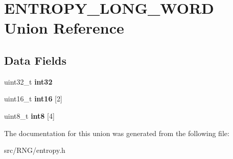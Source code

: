 \hypertarget{union_e_n_t_r_o_p_y___l_o_n_g___w_o_r_d}{\section{E\+N\+T\+R\+O\+P\+Y\+\_\+\+L\+O\+N\+G\+\_\+\+W\+O\+R\+D Union Reference}
\label{union_e_n_t_r_o_p_y___l_o_n_g___w_o_r_d}
}
\subsection*{Data Fields}
\begin{DoxyCompactItemize}
\item 
\hypertarget{union_e_n_t_r_o_p_y___l_o_n_g___w_o_r_d_adfb304a74bc0ee2042775783a2ed5ff5}{uint32\+\_\+t {\bfseries int32}}\label{union_e_n_t_r_o_p_y___l_o_n_g___w_o_r_d_adfb304a74bc0ee2042775783a2ed5ff5}

\item 
\hypertarget{union_e_n_t_r_o_p_y___l_o_n_g___w_o_r_d_af8ada64e3c4ccfbccce2b3331b60b8db}{uint16\+\_\+t {\bfseries int16} \mbox{[}2\mbox{]}}\label{union_e_n_t_r_o_p_y___l_o_n_g___w_o_r_d_af8ada64e3c4ccfbccce2b3331b60b8db}

\item 
\hypertarget{union_e_n_t_r_o_p_y___l_o_n_g___w_o_r_d_a52885b169d6ed0ec05af81f6f4809442}{uint8\+\_\+t {\bfseries int8} \mbox{[}4\mbox{]}}\label{union_e_n_t_r_o_p_y___l_o_n_g___w_o_r_d_a52885b169d6ed0ec05af81f6f4809442}

\end{DoxyCompactItemize}


The documentation for this union was generated from the following file\+:\begin{DoxyCompactItemize}
\item 
src/\+R\+N\+G/entropy.\+h\end{DoxyCompactItemize}
